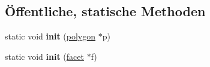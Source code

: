 \subsection*{Öffentliche, statische Methoden}
\begin{DoxyCompactItemize}
\item 
\hypertarget{classtetgenio_aca2fd0dcb29ee3cd313a74d55df2ff2c}{static void {\bfseries init} (\hyperlink{structtetgenio_1_1polygon}{polygon} $\ast$p)}\label{classtetgenio_aca2fd0dcb29ee3cd313a74d55df2ff2c}

\item 
\hypertarget{classtetgenio_a54b1b29c83d5c6e1466bbb087fe1f80e}{static void {\bfseries init} (\hyperlink{structtetgenio_1_1facet}{facet} $\ast$f)}\label{classtetgenio_a54b1b29c83d5c6e1466bbb087fe1f80e}

\end{DoxyCompactItemize}
